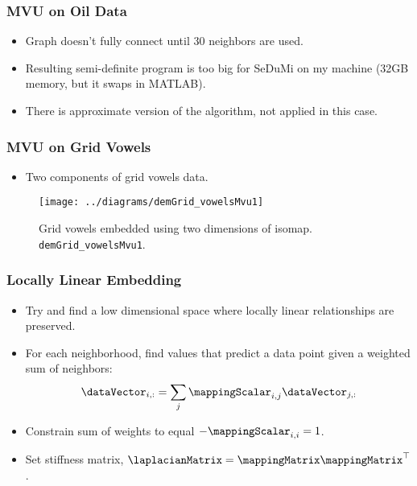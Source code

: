 \subsubsection{MVU on Oil Data}
\begin{itemize}
\item Graph doesn't fully connect until 30 neighbors are used.
\item Resulting semi-definite program is too big for SeDuMi on my machine (32GB memory, but it swaps in MATLAB). 
\item There is approximate version of the algorithm, not applied in this case.
\end{itemize}


\subsubsection{MVU on Grid Vowels}
\begin{itemize}
\item Two components of grid vowels data.
\end{itemize}
\begin{figure}
  \begin{center}
    \texttt{[image: ../diagrams/demGrid\_vowelsMvu1]}
    \caption{Grid vowels embedded using two dimensions of
      isomap. \texttt{demGrid\_vowelsMvu1}.}
  \end{center}
\end{figure}



\subsubsection{Locally Linear Embedding}
\begin{itemize}
\item Try and find a low dimensional space where locally linear relationships are preserved.
\item For each neighborhood, find values that predict a data point given a weighted sum of neighbors:
  \[
  \dataVector_{i,:} = \sum_{j} \mappingScalar_{i, j} \dataVector_{j, :}
  \]
\item Constrain sum of weights to equal $-\mappingScalar_{i,i}=1$.
\item Set stiffness matrix, $\laplacianMatrix = \mappingMatrix\mappingMatrix^\top$.
\end{itemize}





